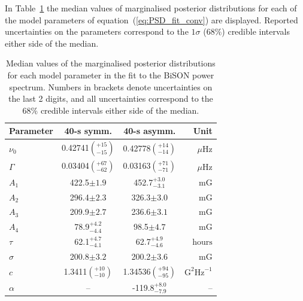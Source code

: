 In Table~\ref{tab:PSD_fit_params} the median values of marginalised posterior distributions for each of the model parameters of equation~(\ref{eq:PSD_fit_conv}) are displayed. Reported uncertainties on the parameters correspond to the $1\sigma$ ($68 \%$) credible intervals either side of the median. 


\begin{table}[ht!]
	\begin{center}
		\caption{Median values of the marginalised posterior distributions for each model parameter in the fit to the BiSON power spectrum. Numbers in brackets denote uncertainties on the last 2 digits, and all uncertainties correspond to the $68 \%$ credible intervals either side of the median.}
		\label{tab:PSD_fit_params}
		\begin{tabular}{l c c r}
			\hline
			{\bf Parameter} & {\bf 40-s symm.} & {\bf 40-s asymm.} & {\bf Unit} \\
			\hline
			
			{$\nu_0$} & {0.42741$\left(_{-15}^{+15}\right)$} & {0.42778$\left(_{-14}^{+14}\right)$} & {$\mu\mathrm{Hz} $}\\
			
			{$\Gamma$} & {0.03404$\left(_{-62}^{+67}\right)$} & {0.03163$\left(_{-71}^{+71}\right)$} & {$\mu\mathrm{Hz} $} \\
			
			{$A_1$} & {422.5$\pm 1.9$} & {452.7$_{-3.1}^{+3.0}$} & {$\mathrm{mG}$} \\
			
			{$A_2$} & {296.4$\pm 2.3$} & {326.3$\pm 3.0$} & {$\mathrm{mG}$} \\
			
			{$A_3$} & {209.9$\pm 2.7$} & {236.6$\pm 3.1$} & {$\mathrm{mG}$} \\
			
			{$A_4$} & {78.9$_{-4.4}^{+4.2}$} & {98.5$\pm 4.7$} &  {$\mathrm{mG}$} \\	
			
			{$\tau$} & {62.1$_{-4.1}^{+4.7}$} & {62.7$_{-4.6}^{+4.9}$} & {$\mathrm{hours}$} \\	
			
			{$\sigma$} & {200.8$\pm 3.2$} & {200.2$\pm 3.6$} &  {$\mathrm{mG}$} \\	
			
			{$c$} & {1.3411$\left(_{-10}^{+10}\right)$} & {1.34536$\left(_{-95}^{+94}\right)$}  & {$\mathrm{G}^2\mathrm{Hz}^{-1}$} \\	
			
			{$\alpha$} & {--} & {-119.8$_{-7.9}^{+8.0}$} & {--} \\	
			\hline
		\end{tabular}
	\end{center}
\end{table}

